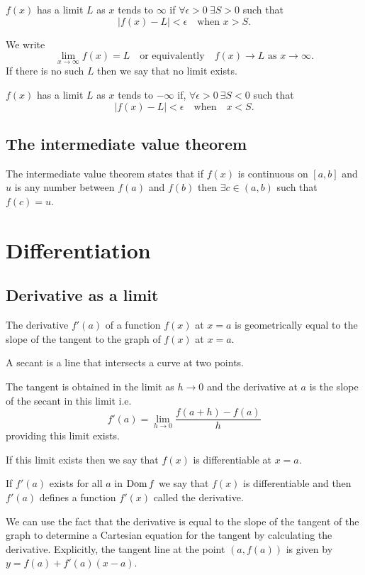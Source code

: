 \documentclass[10pt, a4paper]{article}
\newcommand{\limas}[3][n]{#2 \rightarrow #3 \text{ as } #1 \rightarrow \infty}
\begin{document}
\begin{definition}
    $f(x)$ has a limit $L$ as $x$ tends to $\infty$ if
    $\forall \epsilon > 0\ \exists S > 0$ such that
    \[
    |f(x) - L| < \epsilon\quad\text{when } x > S.
    \]
\end{definition}
We write
\[
\lim_{x \rightarrow \infty}f(x) = L\quad\text{or equivalently}\quad\limas[x]{f(x)}{L}.
\]
If there is no such $L$ then we say that no limit exists.

\begin{definition}
    $f(x)$ has a limit $L$ as $x$ tends to $-\infty$ if, $\forall \epsilon > 0\ \exists S < 0$ such that
    \[
    |f(x) - L| < \epsilon\quad\text{when}\quad x < S.
    \]
\end{definition}

\subsection{The intermediate value theorem}
The intermediate value theorem states that if $f(x)$ is continuous on $[a, b]$ and $u$ is any number between $f(a)$ and $f(b)$ then $\exists c \in (a, b)$ such that $f(c) = u$.

\section{Differentiation}

\subsection{Derivative as a limit}
The derivative $f'(a)$ of a function $f(x)$ at $x = a$ is geometrically equal to the slope of the tangent to the graph of $f(x)$ at $x = a$.

A secant is a line that intersects a curve at two points.

The tangent is obtained in the limit as $h \rightarrow 0$ and the derivative at $a$ is the slope of the secant in this limit i.e.
\[
f'(a) = \lim_{h \rightarrow 0}\frac{f(a + h) - f(a)}{h}
\]
providing this limit exists.

If this limit exists then we say that $f(x)$ is differentiable at $x = a$.

If $f'(a)$ exists for all $a$ in $\operatorname{Dom} f$ we say that $f(x)$ is differentiable and then $f'(a)$ defines a function $f'(x)$ called the derivative.

We can use the fact that the derivative is equal to the slope of the tangent of the graph to determine a Cartesian equation for the tangent by calculating the derivative. Explicitly, the tangent line at the point $(a, f(a))$ is given by $y = f(a) + f'(a)(x - a)$.
\end{document}
